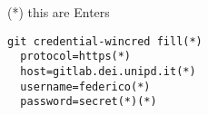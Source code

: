 (*) this are Enters

\begin{lstlisting}[gobble=2]
  git credential-wincred fill(*)
  protocol=https(*)
  host=gitlab.dei.unipd.it(*)
  username=federico(*)
  password=secret(*)(*)
\end{lstlisting}
